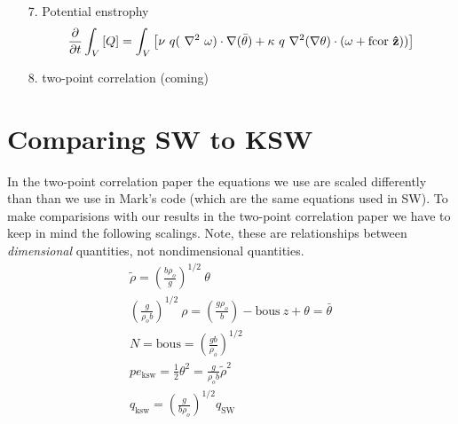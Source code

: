 \documentclass[12pt]{article}
\begin{document}
\begin{itemize}
\item[7.] Potential enstrophy
  \begin{equation} 
    \frac{\partial}{\partial t} \int_V   \left[ Q \right]   
    = \int_V \left[ \nu  ~q (~\nabla^2 ~\mathbf\omega) \cdot \mathbf{\nabla}
      (\bar{\theta})   
      + \kappa  ~q ~\nabla^2 (\mathbf{\nabla} \theta) \cdot  
      (\mathbf\omega   
      + \text{fcor} ~{\bf{\hat{z}}} ))   
    \right]   
  \end{equation} 

\item[8.] two-point correlation (coming)

\end{itemize}

\section{Comparing SW to KSW}
In the two-point correlation paper the equations we use are scaled
differently than than we use in Mark's code (which are the same
equations used in SW). To make comparisions with our results in the
two-point correlation paper we have to keep in mind the following
scalings. Note, these are relationships between {\sl{dimensional}}
quantities, not nondimensional quantities.
\begin{gather}
\tilde\rho = (\frac{b \rho_o}{g})^{1/2} ~\theta\\
(\frac{g}{\rho_o b})^{1/2}~\rho = (\frac{g \rho_o}{b}) - \text{bous}
~z + \theta = \bar\theta \\
N = \text{bous} = (\frac{g b}{\rho_o})^{1/2}\\
pe_{\text{ksw}} = \frac{1}{2} \theta^2 = \frac{g}{\rho_o b} \tilde\rho^2\\
q_{\text{ksw}} = (\frac{g}{b \rho_o})^{1/2} q_{\text{SW}}
\end{gather}
\end{document}

